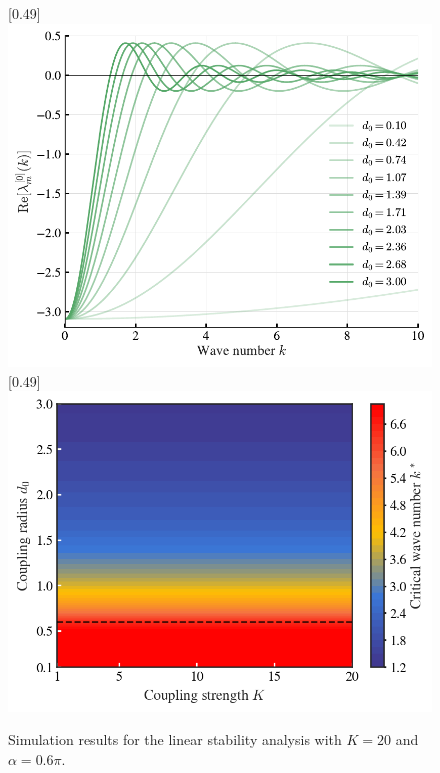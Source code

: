 \documentclass{article}
\begin{document}
\begin{figure}[H]
    \centering
    [0.49\linewidth]{
        \includegraphics[width=\linewidth]{figs/phaseLagPatternFormation_lambda_m.pdf}
    }
    \hfill
    [0.49\linewidth]{
        \includegraphics[width=\linewidth]{figs/orderParameter_Kstar_varying_strengthK_and_distanceD0.png}
    }
    \caption{
        Simulation results for the linear stability analysis with $K=20$ and $\alpha=0.6\pi$.
    }
\end{figure}
\end{document}
